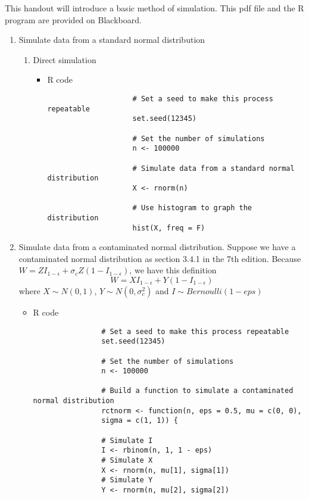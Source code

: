 This handout will introduce a basic method of simulation. This pdf file and the R program are provided on Blackboard.
\begin{enumerate}
	\item Simulate data from a standard normal distribution
		\begin{enumerate}
			\item Direct simulation
				\begin{itemize}
					\item R code
					\begin{verbatim}
					# Set a seed to make this process repeatable
					set.seed(12345) 
					
					# Set the number of simulations
					n <- 100000
					
					# Simulate data from a standard normal distribution
					X <- rnorm(n)
					
					# Use histogram to graph the distribution
					hist(X, freq = F)
					\end{verbatim}
				\end{itemize}
				
		\end{enumerate}
	\item Simulate data from a contaminated normal distribution. Suppose we have a contaminated normal distribution as section 3.4.1 in the 7th edition. Because $W = ZI_{1-\epsilon} + \sigma_c Z (1 - I_{1 - \epsilon})$, we have this definition
		\begin{equation*}
			W = XI_{1-\epsilon} + Y (1 - I_{1 - \epsilon})
		\end{equation*}
	where $X \sim N(0,1)$, $Y \sim N(0, \sigma_c^2)$ and $I \sim Bernoulli(1 - eps)$
		\begin{itemize}
			\item R code
			\begin{verbatim}
				# Set a seed to make this process repeatable
				set.seed(12345) 
				
				# Set the number of simulations
				n <- 100000
				
				# Build a function to simulate a contaminated normal distribution
				rctnorm <- function(n, eps = 0.5, mu = c(0, 0), 
				sigma = c(1, 1)) {
				
				# Simulate I
				I <- rbinom(n, 1, 1 - eps)
				# Simulate X
				X <- rnorm(n, mu[1], sigma[1])
				# Simulate Y
				Y <- rnorm(n, mu[2], sigma[2])
				

\end{verbatim}
\end{itemize}
\end{enumerate}
